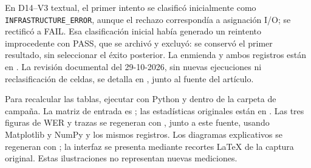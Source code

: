 \documentclass[a4paper,fleqn]{cas-dc}
\begin{document}
En D14--V3 textual, el primer intento se clasificó inicialmente como \texttt{INFRASTRUCTURE\_ERROR}, aunque el rechazo correspondía a asignación I/O; se rectificó a FAIL. Esa clasificación inicial había generado un reintento improcedente con PASS, que se archivó y excluyó: se conservó el primer resultado, sin seleccionar el éxito posterior. La enmienda y ambos registros están en . La revisión documental del 29-10-2026, sin nuevas ejecuciones ni reclasificación de celdas, se detalla en , junto al fuente del artículo.

Para recalcular las tablas, ejecutar con Python  y  dentro de la carpeta de campaña. La matriz de entrada es ; las estadísticas originales están en . Las tres figuras de WER y trazas se regeneran con , junto a este fuente, usando Matplotlib y NumPy y los mismos registros. Los diagramas explicativos se regeneran con ; la interfaz se presenta mediante recortes LaTeX de la captura original. Estas ilustraciones no representan nuevas mediciones.

\clearpage
\addtocounter{page}{-1}
\end{document}
